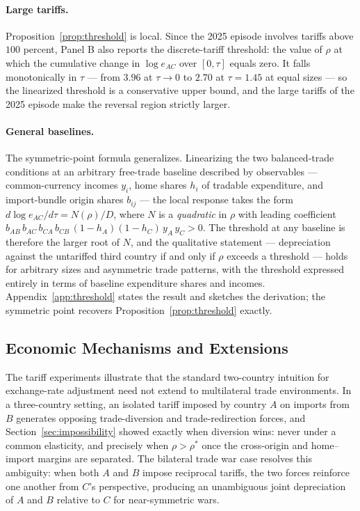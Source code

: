 \documentclass[11pt]{article}
\theoremstyle{plain}
\theoremstyle{remark}
\numberwithin{lemma}{section}
\numberwithin{proposition}{section}
\numberwithin{corollary}{section}
\newcommand{\rev}[1]{{\color{RevBlue}#1}}
\newenvironment{revblock}{\par\begingroup\color{RevBlue}}{\endgroup\par}
\begin{document}
\begin{revblock}
\paragraph{Large tariffs.} Proposition~\ref{prop:threshold} is local. Since the 2025 episode involves tariffs above $100$ percent, Panel B also reports the discrete-tariff threshold: the value of $\rho$ at which the cumulative change in $\log e_{AC}$ over $[0,\tau]$ equals zero. It falls monotonically in $\tau$ --- from $3.96$ at $\tau \to 0$ to $2.70$ at $\tau = 1.45$ at equal sizes --- so the linearized threshold is a conservative upper bound, and the large tariffs of the 2025 episode make the reversal region strictly larger.

\paragraph{General baselines.} The symmetric-point formula generalizes. Linearizing the two balanced-trade conditions at an arbitrary free-trade baseline described by observables --- common-currency incomes $y_i$, home shares $h_i$ of tradable expenditure, and import-bundle origin shares $b_{ij}$ --- the local response takes the form $d\log e_{AC}/d\tau = N(\rho)/D$, where $N$ is a \emph{quadratic} in $\rho$ with leading coefficient $b_{AB}\, b_{AC}\, b_{CA}\, b_{CB}\, (1-h_A)(1-h_C)\, y_A\, y_C > 0$. The threshold at any baseline is therefore the larger root of $N$, and the qualitative statement --- depreciation against the untariffed third country if and only if $\rho$ exceeds a threshold --- holds for arbitrary sizes and asymmetric trade patterns, with the threshold expressed entirely in terms of baseline expenditure shares and incomes. Appendix~\ref{app:threshold} states the result and sketches the derivation; the symmetric point recovers Proposition~\ref{prop:threshold} exactly.
\end{revblock}

\subsection{Economic Mechanisms and Extensions}

The tariff experiments illustrate that the standard two-country intuition for exchange-rate adjustment need not extend to multilateral trade environments. In a three-country setting, an isolated tariff imposed by country $A$ on imports from $B$ generates opposing trade-diversion and trade-redirection forces\rev{, and Section~\ref{sec:impossibility} showed exactly when diversion wins: never under a common elasticity, and precisely when $\rho > \rho^*$ once the cross-origin and home--import margins are separated}. The bilateral trade war case resolves this ambiguity: when both $A$ and $B$ impose reciprocal tariffs, the two forces reinforce one another from $C$'s perspective, producing an unambiguous joint depreciation of $A$ and $B$ relative to $C$ \rev{for near-symmetric wars}.
\end{document}
